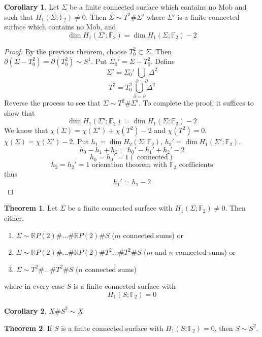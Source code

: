 \documentclass[a4paper,14pt]{extarticle}
\theoremstyle{definition}
\newtheorem*{theorem}{Theorem}
\newtheorem*{corollary}{Corollary}
\begin{document}
\begin{corollary}
	Let $\Sigma$ be a finite connected surface which contains no Mob and such that 
	$H_1(\Sigma;\mathbb{F}_2)\neq0$. Then $\Sigma\sim T^2\#\Sigma'$ where $\Sigma'$ is a finite
	connected surface which contains no Mob, and 
	\[\dim H_1(\Sigma';\mathbb{F}_2)=\dim H_1(\Sigma;\mathbb{F}_2)-2\]
\end{corollary}

\begin{proof}
	By the previous theorem, choose $T_0^2\subset\Sigma$. Then $\partial(\Sigma-T_0^2)=\partial(
		T_0^2)\sim S^1$. Put $\Sigma_0'=\Sigma-T_0^2$. Define \[\Sigma'=\Sigma_0'\bigcup_{\partial
		=\partial}\Delta^2\] \[T^2=T_0^2\bigcup_{\partial=\partial}\Delta^2\] Reverse the 
		process to see that $\Sigma\sim T^2\# \Sigma'$. To complete the proof, it suffices
		to show that 
		\[\dim H_1(\Sigma';\mathbb{F}_2)=\dim H_1(\Sigma;\mathbb{F}_2)-2\] We know that 
		$\chi(\Sigma)=\chi(\Sigma')+\chi(T^2)-2$ and $\chi(T^2)=0$. $\chi(\Sigma)=\chi(\Sigma')-2$.
		Put $h_1=\dim H_2(\Sigma;\mathbb{F}_2)$, $h_2'=\dim H_1(\Sigma';\mathbb{F}_2)$.
		\[h_0-h_1+h_2=h_0'-h_1'+h_2'-2\]\[h_0=h_0'=1 (\text{ connected})\]
		\[h_2=h_2'=1\text{ orienation theorem with $\mathbb{F}_2$ coefficients}\]
		thus \[h_1'=h_1-2\]
\end{proof}

\begin{theorem}
	Let $\Sigma$ be a finite connected surface with $H_1(\Sigma;\mathbb{F}_2)\neq0$. Then 
	either,
	\begin{enumerate}
		\item $\Sigma\sim\mathbb{R}P(2)\#\ldots\#\mathbb{R}P(2)\# S$ ($m$ connected sums) or 
		\item $\Sigma\sim\mathbb{R}P(2)\#\ldots\#\mathbb{R}P(2)\#T^2\ldots\#T^2\# S$ ($m$ and 
		$n$ connected sums) or
		\item $\Sigma\sim T^2\#\ldots\# T^2\# S$ ($n$ connected sums)
	\end{enumerate}
	where in every case $S$ is a finite connected surface with \[H_1(S;\mathbb{F}_2)=0\]
\end{theorem}

\begin{corollary}
	$X\# S^2\sim X$
\end{corollary}

\begin{theorem}
	If $S$ is a finite connected surface with $H_1(S;\mathbb{F}_2)=0$, then $S\sim S^2$.
\end{theorem}
\end{document}
